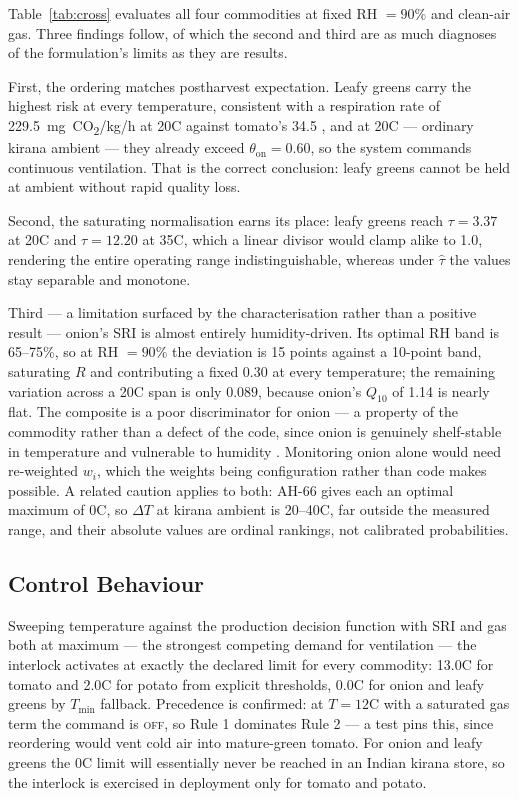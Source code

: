 \documentclass[conference]{IEEEtran}
\begin{document}
Table~\ref{tab:cross} evaluates all four commodities at fixed RH $=90\%$
and clean-air gas. Three findings follow, of which the second and third
are as much diagnoses of the formulation's limits as they are results.

First, the ordering matches postharvest expectation. Leafy greens carry
the highest risk at every temperature, consistent with a respiration rate
of 229.5~mg~CO\textsubscript{2}/kg/h at 20\textdegree C against tomato's
34.5 \cite{ah66}, and at 20\textdegree C --- ordinary kirana ambient ---
they already
exceed $\theta_{\text{on}} = 0.60$, so the system commands continuous
ventilation. That is the correct conclusion: leafy greens cannot be held
at ambient without rapid quality loss.

Second, the saturating normalisation earns its place: leafy greens reach
$\tau = 3.37$ at 20\textdegree C and $\tau = 12.20$ at 35\textdegree C,
which a linear divisor would clamp alike to 1.0, rendering the entire
operating range indistinguishable, whereas under $\hat{\tau}$ the values
stay separable and monotone.

Third --- a limitation surfaced by the characterisation rather than a
positive result --- onion's SRI is almost entirely humidity-driven. Its
optimal RH band is 65--75\%, so at RH $=90\%$ the deviation is 15 points
against a 10-point band, saturating $R$ and contributing a fixed $0.30$ at
every temperature; the remaining variation across a 20\textdegree C span
is only $0.089$, because onion's $Q_{10}$ of 1.14 is nearly flat. The
composite is a poor discriminator for onion --- a property of the
commodity rather than a defect of the code, since onion is genuinely
shelf-stable in temperature and vulnerable to humidity \cite{ah66}. Monitoring onion
alone would need re-weighted $w_i$, which the weights being configuration
rather than code makes possible. A related caution applies to both: AH-66
gives each an optimal maximum of 0\textdegree C, so $\Delta T$ at kirana
ambient is 20--40\textdegree C, far outside the measured range, and their
absolute values are ordinal rankings, not calibrated probabilities.

\subsection{Control Behaviour}
\label{sec:control}

Sweeping temperature against the production decision function with SRI and
gas both at maximum --- the strongest competing demand for ventilation ---
the interlock activates at exactly the declared limit for every commodity:
13.0\textdegree C for tomato and 2.0\textdegree C for potato from explicit
thresholds, 0.0\textdegree C for onion and leafy greens by $T_{\min}$
fallback. Precedence is confirmed: at $T = 12$\textdegree C with a
saturated gas term the command is \textsc{off}, so Rule 1 dominates Rule 2
--- a test pins this, since reordering would vent cold air into
mature-green tomato. For onion and leafy greens the 0\textdegree C limit
will essentially never be reached in an Indian kirana store, so the
interlock is exercised in deployment only for tomato and potato.
\end{document}
